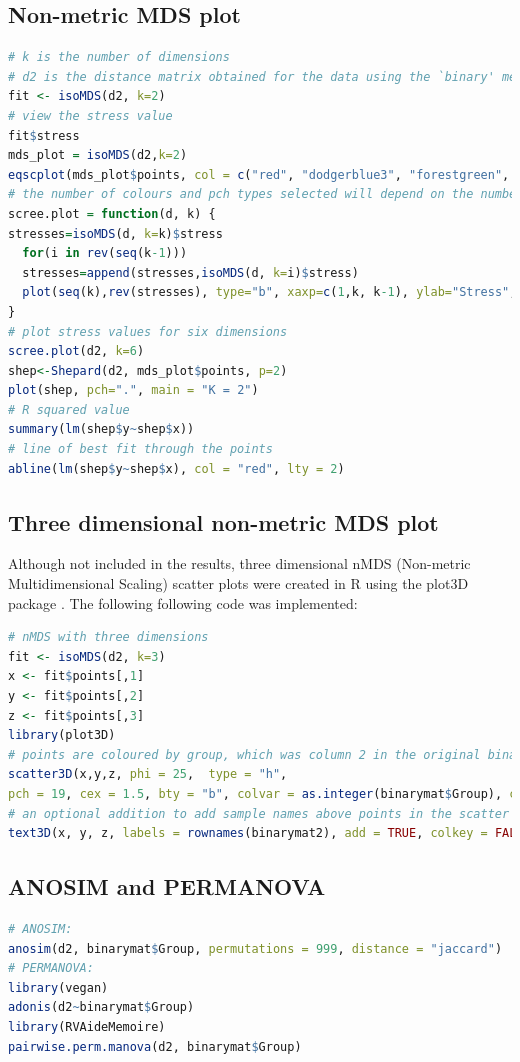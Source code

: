 \subsection{Non-metric MDS plot}
\label{appendix:RCODE, nmds}
\begin{lstlisting}[language=R]
# k is the number of dimensions
# d2 is the distance matrix obtained for the data using the `binary' method
fit <- isoMDS(d2, k=2) 
# view the stress value
fit$stress 
mds_plot = isoMDS(d2,k=2)
eqscplot(mds_plot$points, col = c("red", "dodgerblue3", "forestgreen", "orange")[binarymat$Group], pch = c(15, 16, 17,18)[binmat$Group])
# the number of colours and pch types selected will depend on the number of groups (binarymat$Group) inputted
scree.plot = function(d, k) {
stresses=isoMDS(d, k=k)$stress
  for(i in rev(seq(k-1)))  
  stresses=append(stresses,isoMDS(d, k=i)$stress)
  plot(seq(k),rev(stresses), type="b", xaxp=c(1,k, k-1), ylab="Stress", xlab="Number of dimensions")
}
# plot stress values for six dimensions
scree.plot(d2, k=6) 
shep<-Shepard(d2, mds_plot$points, p=2)
plot(shep, pch=".", main = "K = 2")
# R squared value
summary(lm(shep$y~shep$x)) 
# line of best fit through the points
abline(lm(shep$y~shep$x), col = "red", lty = 2) 
\end{lstlisting}

\subsection{Three dimensional non-metric MDS plot}
Although not included in the results, three dimensional nMDS (Non-metric Multidimensional Scaling) scatter plots were created in R using the plot3D package \citep{Soetaert}. The following following code was implemented: \newline

\begin{lstlisting}[language=R]
# nMDS with three dimensions
fit <- isoMDS(d2, k=3) 
x <- fit$points[,1]
y <- fit$points[,2]
z <- fit$points[,3]
library(plot3D)
# points are coloured by group, which was column 2 in the original binarymat matrix
scatter3D(x,y,z, phi = 25,  type = "h", 
pch = 19, cex = 1.5, bty = "b", colvar = as.integer(binarymat$Group), col = c("blue", "red"), colkey = list(side = 2, length = 0.5))
# an optional addition to add sample names above points in the scatter plot
text3D(x, y, z, labels = rownames(binarymat2), add = TRUE, colkey = FALSE, cex = 0.7) 
\end{lstlisting}

\subsection{ANOSIM and PERMANOVA}
\label{appendix:RCODE,anosim,permanova}
\begin{lstlisting}[language=R]
# ANOSIM:
anosim(d2, binarymat$Group, permutations = 999, distance = "jaccard")
# PERMANOVA:
library(vegan)
adonis(d2~binarymat$Group)
library(RVAideMemoire)
pairwise.perm.manova(d2, binarymat$Group)
\end{lstlisting}


